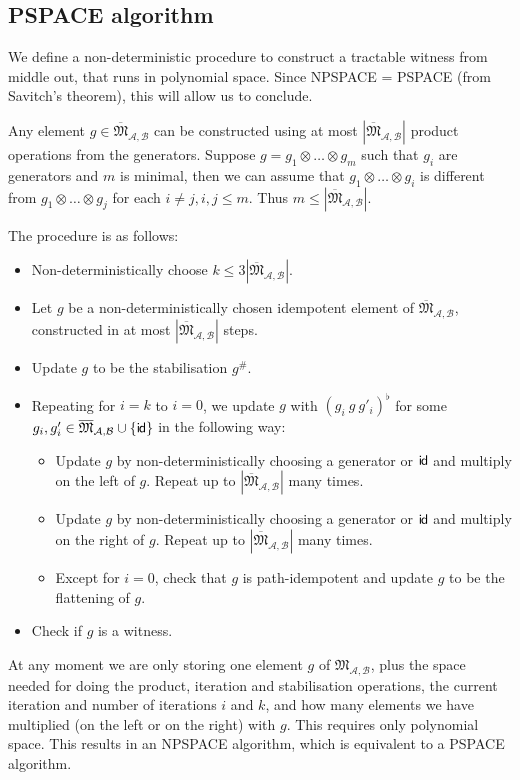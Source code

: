 \documentclass{lmcs}
\theoremstyle{remark}
\newcommand{\ideal}{\mathfrak{M}}
\newcommand{\autA}{\mathcal{A}}
\newcommand{\autB}{\mathcal{B}}
\newcommand{\monoidid}{\mathsf{i\kern-0.8pt d}}
\theoremstyle{remark}
\begin{document}
\subsection{PSPACE algorithm}

We define a non-deterministic procedure to construct a tractable witness from middle out, that runs in polynomial space. Since NPSPACE = PSPACE (from Savitch's theorem), this will allow us to conclude.

Any element $g \in \overline{\ideal}_{\autA,\autB}$ can be constructed using at most ${|\overline{\ideal}_{\autA,\autB}|}$ product operations from the generators. Suppose $g= g_1\otimes \dots\otimes g_m$ such that $g_i$ are generators and $m$ is minimal, then we can assume that $g_1\otimes \dots\otimes g_i$ is different from  $g_1\otimes \dots\otimes g_j$ for each $i\ne j, i,j\le m$. Thus $m \le {|\overline{\ideal}_{\autA,\autB}|}$.

The procedure is as follows:
\begin{itemize} 
    \item Non-deterministically choose $k \le 3|\overline{\ideal}_{\autA,\autB}|$.
    \item Let $g$ be a non-deterministically chosen  idempotent element of $\overline{\ideal}_{\autA,\autB}$, constructed in at most ${|\overline{\ideal}_{\autA,\autB}|}$ steps.
    \item Update $g$ to be the stabilisation $g^\#$.
    \item Repeating for $i = k$ to $ i = 0$, we update $g$ with $(g_i \  g \ g'_{i})^\flat$ for some $g_i,g_i'\in  \overline{\ideal}_{\autA,\autB}\cup\{\monoidid\}$ in the following way:
    \begin{itemize}
    \item Update $g$ by non-deterministically choosing a generator or $\monoidid$ and multiply on the left of $g$. Repeat up to ${|\overline{\ideal}_{\autA,\autB}|}$ many times.
    \item Update $g$ by non-deterministically choosing a generator or $\monoidid$ and multiply on the right of $g$. Repeat up to ${|\overline{\ideal}_{\autA,\autB}|}$ many times.
    \item Except for $i = 0$, check that $g$ is path-idempotent and update $g$ to be the flattening of \nolinebreak $g$.
    \end{itemize}
    \item Check if $g$ is a witness.
\end{itemize}
At any moment we are only storing one element $g$ of $\ideal_{\autA,\autB}$, plus the space needed for doing the product, iteration and stabilisation operations, the  current iteration and number of iterations $i$ and $k$, and how many elements we have multiplied (on the left or on the right) with $g$. This requires only polynomial space.
This results in an NPSPACE algorithm, which is equivalent to a PSPACE algorithm.
\end{document}
